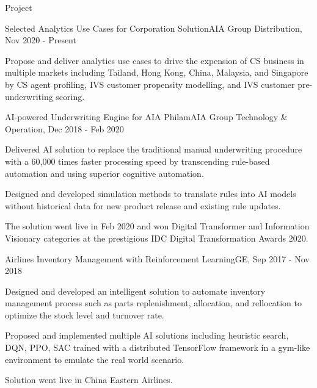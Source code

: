 \documentclass{resume} %
\begin{document}
\begin{rSection}{Project}

\begin{rSubsection}{Selected Analytics Use Cases for Corporation Solution}{}{AIA Group Distribution, Nov 2020 - Present}{}
\item Propose and deliver analytics use cases to drive the expension of CS business in multiple markets including Tailand, Hong Kong, China, Malaysia, and Singapore by CS agent profiling, IVS customer propensity modelling, and IVS customer pre-underwriting scoring.
\end{rSubsection}


\begin{rSubsection}{AI-powered Underwriting Engine for AIA Philam}{}{AIA Group Technology \& Operation, Dec 2018 - Feb 2020}{}
\item Delivered AI solution to replace the traditional manual underwriting procedure with a 60,000 times faster processing speed by transcending rule-based automation and using superior cognitive automation.
\item Designed and developed simulation methods to translate rules into AI models without historical data for new product release and existing rule updates.
\item The solution went live in Feb 2020 and won Digital Transformer and Information Visionary categories at the prestigious IDC Digital Transformation Awards 2020.
\end{rSubsection}


\begin{rSubsection}{Airlines Inventory Management with Reinforcement Learning}{}{GE, Sep 2017 - Nov 2018}{}
\item Designed and developed an intelligent solution to automate inventory management process such as parts replenishment, allocation, and rellocation to optimize the stock level and turnover rate. 
\item Proposed and implemented multiple AI solutions including heuristic search, DQN, PPO, SAC trained with a distributed TensorFlow framework in a gym-like environment to emulate the real world scenario.
\item Solution went live in China Eastern Airlines.
\end{rSubsection}



\end{rSection}
\end{document}
